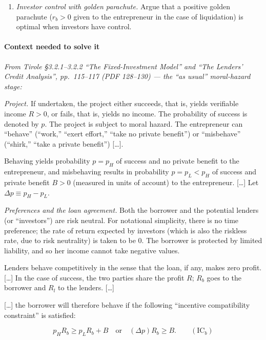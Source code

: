 \documentclass[11pt,a4paper]{article}
\providecommand{\tightlist}{\setlength{\itemsep}{0pt}\setlength{\parskip}{0pt}}
\begin{document}
\begin{enumerate}
\def\labelenumi{(\alph{enumi})}
\setcounter{enumi}{21}
\tightlist
\item
  \emph{Investor control with golden parachute.} Argue that a positive golden parachute (\(r_b > 0\)
  given to the entrepreneur in the case of liquidation) is optimal when investors have control.
\end{enumerate}

\paragraph{Context needed to solve it}

\emph{From Tirole §3.2.1--3.2.2 ``The Fixed-Investment Model'' and ``The Lenders' Credit Analysis'',
pp.~115--117 (PDF 128--130) --- the ``as usual'' moral-hazard stage:}

\emph{Project.} If undertaken, the project either succeeds, that is, yields verifiable income
\(R > 0\), or fails, that is, yields no income. The probability of success is denoted by \(p\). The
project is subject to moral hazard. The entrepreneur can ``behave'' (``work,'' ``exert effort,''
``take no private benefit'') or ``misbehave'' (``shirk,'' ``take a private benefit'') {[}\ldots{]}.

Behaving yields probability \(p = p_H\) of success and no private benefit to the entrepreneur, and
misbehaving results in probability \(p = p_L < p_H\) of success and private benefit \(B > 0\)
(measured in units of account) to the entrepreneur. {[}\ldots{]} Let \(\Delta p \equiv p_H - p_L\).

\emph{Preferences and the loan agreement.} Both the borrower and the potential lenders (or
``investors'') are risk neutral. For notational simplicity, there is no time preference; the rate of
return expected by investors (which is also the riskless rate, due to risk neutrality) is taken to
be 0. The borrower is protected by limited liability, and so her income cannot take negative values.

Lenders behave competitively in the sense that the loan, if any, makes zero profit. {[}\ldots{]} In
the case of success, the two parties share the profit \(R\); \(R_b\) goes to the borrower and
\(R_l\) to the lenders. {[}\ldots{]}

{[}\ldots{]} the borrower will therefore behave if the following ``incentive compatibility
constraint'' is satisfied:

\[p_H R_b \geqslant p_L R_b + B \quad\text{or}\quad (\Delta p)R_b \geqslant B. \qquad (\text{IC}_b)\]
\end{document}
